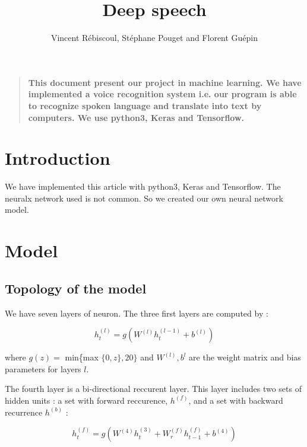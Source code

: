 \documentclass[12pt]{article}
\title{Deep speech}
\author
{Vincent R\'ebiscoul, St\'ephane Pouget and Florent Gu\'epin}
\date{}
\newenvironment{sciabstract}{%
\begin{quote} \bf}
{\end{quote}}
\begin{document}
 


\baselineskip24pt


\maketitle 




\begin{sciabstract}
  This document present our project in machine learning. We have implemented a voice recognition system i.e. our program is able to recognize spoken language and translate into text by computers.
 We use python3, Keras and Tensorflow.
\end{sciabstract}



\section*{Introduction}

We have implemented this article \cite{article} with python3, Keras and Tensorflow. The neuralx network used is not common. So we created our own neural network model.

\section{Model}

\subsection{Topology of the model}

We have seven layers of neuron. The three first layers are computed by :

\[ h_t^{(l)} = g(W^{(l)}h_t^{(l-1)} + b^{(l)}) \]

where $g(z) =$ min\{max $\{0,z\}, 20\}$ and $W^{(l)}, b^{l}$ are the weight matrix and bias parameters for layers $l$.

The fourth layer is a bi-directional reccurent layer. This layer includes two sets of hidden units : a set with forward reccurence, $h^{(f)}$, and a set with backward recurrence $h^{(b)}$ : 

\[ h_t^{(f)} = g(W^{(4)}h_t^{(3)} + W_r^{(f)}h_{t-1}^{(f)} + b^{(4)}) \]
\end{document}
